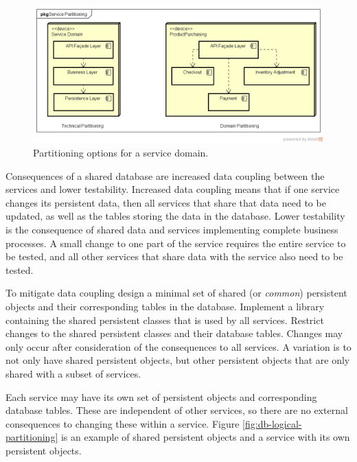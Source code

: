 \begin{figure}[h!]
    \centering
    \includegraphics[trim=38 38 19 45,clip,width=\textwidth]{diagrams/service-partitions.png}
    \vspace{-10pt}
    \caption{Partitioning options for a service domain.}
    \label{fig:service-partitions}
\end{figure}

Consequences of a shared database are increased data coupling between the services and lower testability.
Increased data coupling means that if one service changes its persistent data,
then all services that share that data need to be updated, as well as the tables storing the data in the database.
Lower testability is the consequence of shared data and services implementing complete business processes.
A small change to one part of the service requires the entire service to be tested,
and all other services that share data with the service also need to be tested.

To mitigate data coupling design a minimal set of shared (or \emph{common}) persistent objects and their corresponding tables in the database.
Implement a library containing the shared persistent classes that is used by all services.
Restrict changes to the shared persistent classes and their database tables.
Changes may only occur after consideration of the consequences to all services.
A variation is to not only have shared persistent objects,
but other persistent objects that are only shared with a subset of services.

Each service may have its own set of persistent objects and corresponding database tables.
These are independent of other services, so there are no external consequences to changing these within a service.
Figure \ref{fig:db-logical-partitioning} is an example of shared persistent objects and a service with its own persistent objects.

